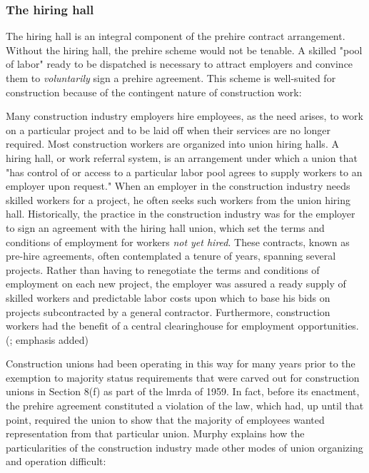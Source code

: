 \documentclass[12pt]{article}
\renewenvironment{quote}
  {\list{}{\leftmargin=\parindent\rightmargin=0pt}%
   \item\relax}
  {\endlist}
\begin{document}
\subsubsection{The hiring hall}

The hiring hall is an integral component of the prehire contract arrangement. Without the hiring hall, the prehire scheme would not be tenable. A skilled "pool of labor" ready to be dispatched is necessary to attract employers and convince them to \emph{voluntarily} sign a prehire agreement. This scheme is well-suited for construction because of the contingent nature of construction work:

\begin{quote}
Many construction industry employers hire employees, as the need arises, to work on a particular project and to be laid off when their services are no longer required. Most construction workers are organized into union hiring halls. A hiring hall, or work referral system, is an arrangement under which a union that "has control of or access to a particular labor pool agrees to supply workers to an employer upon request." When an employer in the construction industry needs skilled workers for a project, he often seeks such workers from the union hiring hall. Historically, the practice in the construction industry was for the employer to sign an agreement with the hiring hall union, which set the terms and conditions of employment for workers \textit{not yet hired}. These contracts, known as pre-hire agreements, often contemplated a tenure of years, spanning several projects. Rather than having to renegotiate the terms and conditions of employment on each new project, the employer was assured a ready supply of skilled workers and predictable labor costs upon which to base his bids on projects subcontracted by a general contractor. Furthermore, construction workers had the benefit of a central clearinghouse for employment opportunities. (\cite[1014–15]{murphyPreHireAgreementsSection1982}; emphasis added)
\end{quote}

Construction unions had been operating in this way for many years prior to the exemption to majority status requirements that were carved out for construction unions in Section 8(f) as part of the \acrshort{lmrda} of 1959. In fact, before its enactment, the prehire agreement constituted a violation of the law, which had, up until that point, required the union to show that the majority of employees wanted representation from that particular union. Murphy explains how the particularities of the construction industry made other modes of union organizing and operation difficult:
\end{document}
